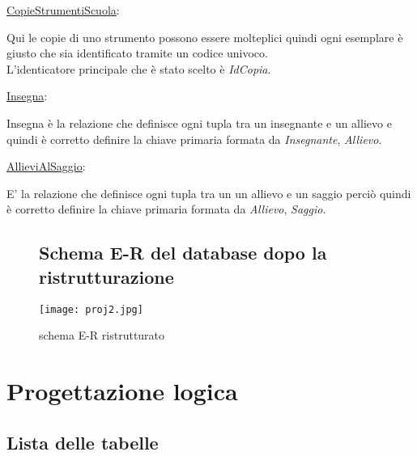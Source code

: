\documentclass{article}
\begin{document}
\begin{flushleft}
\underline{CopieStrumentiScuola}:
\end{flushleft}

\begin{flushleft}
Qui le copie di uno strumento possono essere molteplici quindi ogni esemplare è giusto che sia identificato tramite un codice univoco. \\L'identicatore principale che è stato scelto è \emph{IdCopia}.
\end{flushleft}

\begin{flushleft}
\underline{Insegna}:
\end{flushleft}

\begin{flushleft}
Insegna è la relazione che definisce ogni tupla tra un insegnante e un allievo e quindi è corretto definire la chiave primaria formata da \emph{Insegnante}, \emph{Allievo}.
\end{flushleft}

\begin{flushleft}
\underline{AllieviAlSaggio}:
\end{flushleft}

\begin{flushleft}
E' la relazione che definisce ogni tupla tra un un allievo e un saggio perciò quindi è corretto definire la chiave primaria formata da \emph{Allievo}, \emph{Saggio}.
\end{flushleft}

\newpage
\thispagestyle{empty}
\begin{landscape}
\begin{figure}
\subsection{Schema E-R del database dopo la ristrutturazione}
\centering
\texttt{[image: proj2.jpg]}
\hspace{1in}
\label{schema}
\caption{schema E-R ristrutturato}
\end{figure}
\end{landscape}

\newpage
\section{Progettazione logica}\bigskip

\subsection{Lista delle tabelle}
\end{document}
